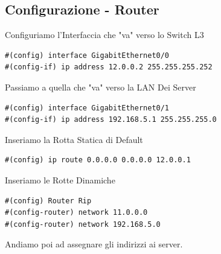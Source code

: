 \documentclass[12pt]{article}
\begin{document}
    \subsection{Configurazione - Router}
    \begin{center}
        Configuriamo l'Interfaccia che "va" verso lo Switch L3
        \begin{tcolorbox}[title=Multilayer Switch, colframe=gray!50!gray, colback=white!50!white]
            \begin{lstlisting}
#(config) interface GigabitEthernet0/0
#(config-if) ip address 12.0.0.2 255.255.255.252
            \end{lstlisting}
            Passiamo a quella che "va" verso la LAN Dei Server
            \begin{lstlisting}
#(config) interface GigabitEthernet0/1
#(config-if) ip address 192.168.5.1 255.255.255.0
\end{lstlisting}
        \end{tcolorbox}
        Inseriamo la Rotta Statica di Default
            \begin{tcolorbox}[title=Multilayer Switch, colframe=gray!50!gray, colback=white!50!white]
                \begin{lstlisting}
#(config) ip route 0.0.0.0 0.0.0.0 12.0.0.1
                \end{lstlisting} 
            \end{tcolorbox}
            Inseriamo le Rotte Dinamiche 
            \begin{tcolorbox}[title=Multilayer Switch, colframe=gray!50!gray, colback=white!50!white]
                \begin{lstlisting}
#(config) Router Rip
#(config-router) network 11.0.0.0
#(config-router) network 192.168.5.0
                \end{lstlisting}    
            \end{tcolorbox}
            Andiamo poi ad assegnare gli indirizzi ai server.
    \end{center}
\end{document}
